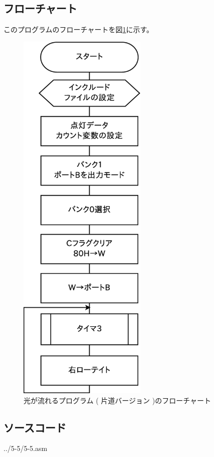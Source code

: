 \documentclass[a4paper,12pt]{ujarticle}
\begin{document}
  \subsection{フローチャート}
  このプログラムのフローチャートを図\ref{fig:flow_5-5}に示す。
  \begin{figure}[htbp]
   \begin{center}
     \includegraphics[height=185mm]{Diagram5-5.eps}
   \end{center}
   \caption{光が流れるプログラム ( 片道バージョン )のフローチャート}
   \label{fig:flow_5-5}
  \end{figure}
   \clearpage
  \subsection{ソースコード}
   \begin{lstinputlisting}[basicstyle=\ttfamily\footnotesize, frame=single,numbers=left]
    {../5-5/5-5.asm}
   \end{lstinputlisting}
   \clearpage
\end{document}
